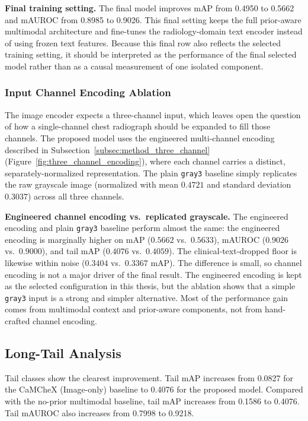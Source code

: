 \textbf{Final training setting.} The final model improves mAP from 0.4950 to 0.5662 and mAUROC from 0.8985 to 0.9026. This final setting keeps the full prior-aware multimodal architecture and fine-tunes the radiology-domain text encoder instead of using frozen text features. Because this final row also reflects the selected training setting, it should be interpreted as the performance of the final selected model rather than as a causal measurement of one isolated component.

\subsubsection{Input Channel Encoding Ablation}
\label{subsubsec:ablation_channels}

The image encoder expects a three-channel input, which leaves open the question of how a single-channel chest radiograph should be expanded to fill those channels. The proposed model uses the engineered multi-channel encoding described in Subsection~\ref{subsec:method_three_channel} (Figure~\ref{fig:three_channel_encoding}), where each channel carries a distinct, separately-normalized representation. The plain \texttt{gray3} baseline simply replicates the raw grayscale image (normalized with mean $0.4721$ and standard deviation $0.3037$) across all three channels.

\textbf{Engineered channel encoding vs.\ replicated grayscale.} The engineered encoding and plain \texttt{gray3} baseline perform almost the same: the engineered encoding is marginally higher on mAP ($0.5662$ vs.\ $0.5633$), mAUROC ($0.9026$ vs.\ $0.9000$), and tail mAP ($0.4076$ vs.\ $0.4059$). The clinical-text-dropped floor is likewise within noise ($0.3404$ vs.\ $0.3367$ mAP). The difference is small, so channel encoding is not a major driver of the final result. The engineered encoding is kept as the selected configuration in this thesis, but the ablation shows that a simple \texttt{gray3} input is a strong and simpler alternative. Most of the performance gain comes from multimodal context and prior-aware components, not from hand-crafted channel encoding.

\subsection{Long-Tail Analysis}
\label{subsec:results_longtail}

Tail classes show the clearest improvement. Tail mAP increases from 0.0827 for the CaMCheX (Image-only) baseline to 0.4076 for the proposed model. Compared with the no-prior multimodal baseline, tail mAP increases from 0.1586 to 0.4076. Tail mAUROC also increases from 0.7998 to 0.9218.

